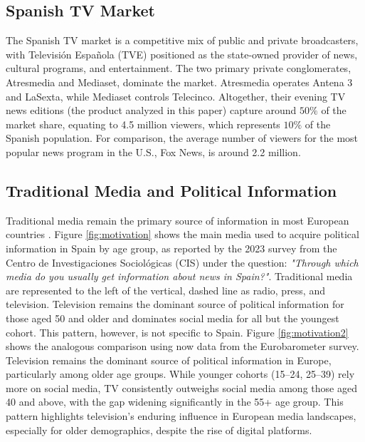\documentclass[12pt]{article}
\begin{document}
	\label{section:context}
	
	\subsection*{Spanish TV Market}
	
	The Spanish TV market is a competitive mix of public and private broadcasters, with Televisión Española (TVE) positioned as the state-owned provider of news, cultural programs, and entertainment. The two primary private conglomerates, Atresmedia and Mediaset, dominate the market. Atresmedia operates Antena 3 and LaSexta, while Mediaset controls Telecinco. Altogether, their evening TV news editions (the product analyzed in this paper) capture around $50\%$ of the market share, equating to 4.5 million viewers, which represents $10\%$ of the Spanish population. For comparison, the average number of viewers for the most popular news program in the U.S., Fox News, is around 2.2 million.
	
	\subsection*{Traditional Media and Political Information}
	
	Traditional media remain the primary source of information in most European countries \citep{europarl2024}. Figure \ref{fig:motivation} shows the main media used to acquire political information in Spain by age group, as reported by the 2023 survey from the Centro de Investigaciones Sociológicas (CIS) under the question: \textit{"Through which media do you usually get information about news in Spain?"}. Traditional media are represented to the left of the vertical, dashed line as radio, press, and television. Television remains the dominant source of political information for those aged 50 and older and dominates social media for all but the youngest cohort. This pattern, however, is not specific to Spain. Figure \ref{fig:motivation2} shows the analogous comparison using now data from the Eurobarometer survey.  Television remains the dominant source of political information in Europe, particularly among older age groups. While younger cohorts (15--24, 25--39) rely more on social media, TV consistently outweighs social media among those aged 40 and above, with the gap widening significantly in the 55+ age group. This pattern highlights television’s enduring influence in European media landscapes, especially for older demographics, despite the rise of digital platforms.
	
\end{document}
